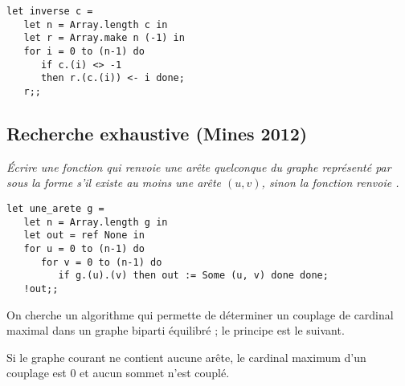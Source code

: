 \begin{Answer}
\begin{lstlisting}
let inverse c = 
   let n = Array.length c in
   let r = Array.make n (-1) in
   for i = 0 to (n-1) do
      if c.(i) <> -1
      then r.(c.(i)) <- i done;
   r;;
\end{lstlisting}
\end{Answer}
\subsection{Recherche exhaustive (Mines 2012)}
\begin{Exercise}[title=]\it
Écrire une fonction  qui renvoie une arête quelconque du graphe représenté par  sous la forme  s'il existe au moins une arête $(u, v)$, sinon la fonction renvoie  .
\end{Exercise}
\begin{Answer}
\begin{lstlisting}
let une_arete g =
   let n = Array.length g in
   let out = ref None in
   for u = 0 to (n-1) do
      for v = 0 to (n-1) do
         if g.(u).(v) then out := Some (u, v) done done;
   !out;;
\end{lstlisting}
\end{Answer}
On cherche un algorithme qui permette de déterminer un couplage de cardinal maximal dans un graphe biparti équilibré ; le principe est le suivant.

Si le graphe courant ne contient aucune arête, le cardinal maximum d'un couplage est 0 et aucun sommet n'est couplé.

